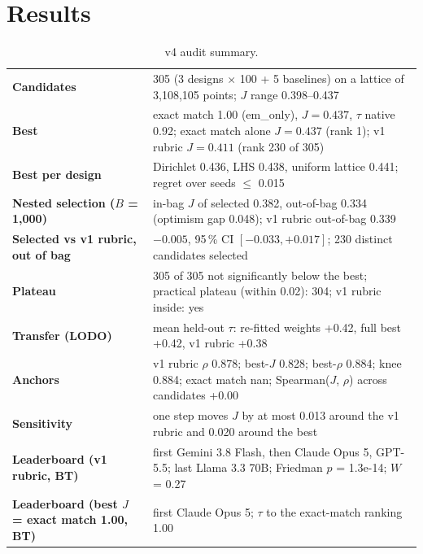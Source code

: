 \documentclass[11pt]{article}
\begin{document}
\section{Results}
\begin{table}[htbp]\centering\small\caption{v4 audit summary.}\label{tab:v4_summary}
\begin{tabularx}{\textwidth}{>{\bfseries}p{} L}\toprule
Candidates & 305 (3 designs $\times$ 100 + 5 baselines) on a lattice of 3,108,105 points; $J$ range 0.398--0.437 \\
Best & exact match 1.00 (em\_\allowbreak{}only), $J = 0.437$, $\tau$ native 0.92; exact match alone $J = 0.437$ (rank 1); v1 rubric $J = 0.411$ (rank 230 of 305) \\
Best per design & Dirichlet 0.436, LHS 0.438, uniform lattice 0.441; regret over seeds $\le$ 0.015 \\
Nested selection ($B$ = 1,000) & in-bag $J$ of selected 0.382, out-of-bag 0.334 (optimism gap 0.048); v1 rubric out-of-bag 0.339 \\
Selected vs v1 rubric, out of bag & $-0.005$, 95\,\% CI $[-0.033, +0.017]$; 230 distinct candidates selected \\
Plateau & 305 of 305 not significantly below the best; practical plateau (within 0.02): 304; v1 rubric inside: yes \\
Transfer (LODO) & mean held-out $\tau$: re-fitted weights +0.42, full best +0.42, v1 rubric +0.38 \\
Anchors & v1 rubric $\rho$ 0.878; best-$J$ 0.828; best-$\rho$ 0.884; knee 0.884; exact match nan; Spearman($J$, $\rho$) across candidates +0.00 \\
Sensitivity & one step moves $J$ by at most 0.013 around the v1 rubric and 0.020 around the best \\
Leaderboard (v1 rubric, BT) & first Gemini 3.8 Flash, then Claude Opus 5, GPT-5.5; last Llama 3.3 70B; Friedman $p$ = 1.3e-14; $W$ = 0.27 \\
Leaderboard (best $J$ = exact match 1.00, BT) & first Claude Opus 5; $\tau$ to the exact-match ranking 1.00 \\
\bottomrule\end{tabularx}\end{table}
\end{document}
